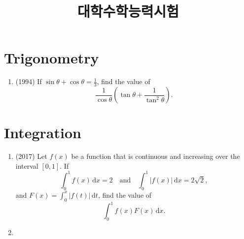 \documentclass{amsart}
\title{대학수학능력시험}
\begin{document}
\maketitle

\section*{Trigonometry}

\begin{enumerate}
\item (1994) If $\displaystyle \sin \theta + \cos \theta = \frac{1}{3}$, find the value of
  \[
    \frac{1}{\cos \theta} \left( \tan \theta + \frac{1}{\tan^2 \theta} \right).
  \]

\end{enumerate}

\section*{Integration}

\begin{enumerate}
\item (2017) Let $f(x)$ be a function that is continuous and increasing over the interval $[0, 1]$. If
  \[
    \int_0^1 f(x) \, \mathrm{d}x = 2 \quad \text{and} \quad \int_0^1 |f(x)| \, \mathrm{d}x = 2 \sqrt{2},
  \]
  and $\displaystyle F(x) = \int_0^x |f(t)| \, \mathrm{d}t$, find the value of
  \[
    \int_0^1 f(x) F(x) \, \mathrm{d}x.
  \]

\item
\end{enumerate}
\end{document}
